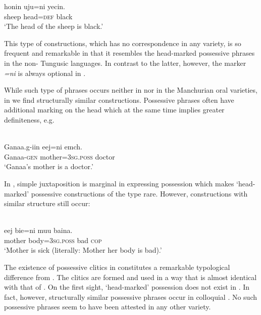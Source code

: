 \documentclass[output=paper,colorlinks,citecolor=brown]{langscibook}
\begin{document}
\ea
    \label{example9.30}
    \gll honin 	uju=ni 		yecin.\\
    sheep 	head=\textsc{def}	black\\
    \glt `The head of the sheep is black.'\\
    \z

This type of constructions, which has no correspondence in any  variety, is so frequent and remarkable in  that it resembles the head-marked possessive phrases in the non- Tungusic languages. In contrast to the latter, however, the marker \textit{=ni} is always optional in .

While such type of phrases occurs neither in  nor in the Manchurian oral varieties, in  we find structurally similar constructions. Possessive phrases often have additional marking on the head which at the same time implies greater definiteness, e.g.

\ea
    \label{example9.31}
    \\
    \gll Ganaa.g-iin eej=ni 			emch.\\
    Ganaa-\textsc{gen} mother=3\textsc{sg.poss} 	doctor\\
    \glt `Ganaa’s mother is a doctor.'\\
    \z

In , simple juxtaposition is marginal in expressing possession which makes ‘head-marked’ possessive constructions of the  type rare. However, constructions with similar structure still occur:

\ea
    \label{example9.32}
    \\
    \gll eej 	bie=ni 			muu 	baina.\\
    mother	body=3\textsc{sg.poss}	bad	\textsc{cop}\\
    \glt `Mother is sick (literally: Mother her body is bad).'\\
    \z

 The existence of possessive clitics in  constitutes a remarkable typological difference from . The clitics are formed and used in a way that is almost identical with that of . On the first sight, ‘head-marked’ possession does not exist in . In fact, however, structurally similar possessive phrases occur in colloquial . No such possessive phrases seem to have been attested in any other  variety.
\end{document}
